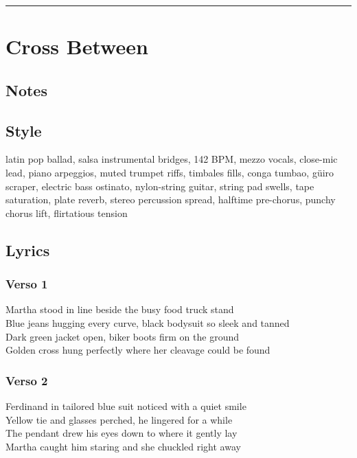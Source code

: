 \begin{center}\rule{0.5\linewidth}{0.5pt}\end{center}

\section{Cross Between}\label{cross-between}

\subsection{Notes}\label{notes-40}

\subsection{Style}\label{style-39}

latin pop ballad, salsa instrumental bridges, 142 BPM, mezzo vocals,
close-mic lead, piano arpeggios, muted trumpet riffs, timbales fills,
conga tumbao, güiro scraper, electric bass ostinato, nylon-string
guitar, string pad swells, tape saturation, plate reverb, stereo
percussion spread, halftime pre-chorus, punchy chorus lift, flirtatious
tension

\subsection{Lyrics}\label{lyrics-39}

\subsubsection{Verso 1}\label{verso-1-1}

Martha stood in line beside the busy food truck stand\\
Blue jeans hugging every curve, black bodysuit so sleek and tanned\\
Dark green jacket open, biker boots firm on the ground\\
Golden cross hung perfectly where her cleavage could be found

\subsubsection{Verso 2}\label{verso-2-1}

Ferdinand in tailored blue suit noticed with a quiet smile\\
Yellow tie and glasses perched, he lingered for a while\\
The pendant drew his eyes down to where it gently lay\\
Martha caught him staring and she chuckled right away

